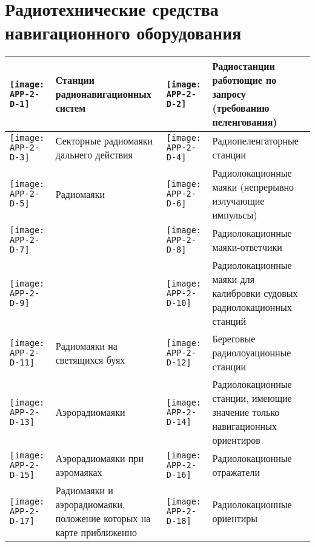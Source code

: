 \section{Радиотехнические средства навигационного оборудования}%

\small
\begin{longtable}{M|m{0.2\textwidth}|M|m{0.2\textwidth}}
  \toprule
  \texttt{[image: APP-2-D-1]} & Станции радионавигационных систем &
  \texttt{[image: APP-2-D-2]} & Радиостанции работющие по запросу (требованию пеленгования) \\
  \midrule
  \texttt{[image: APP-2-D-3]} & Секторные радиомаяки дальнего действия &
  \texttt{[image: APP-2-D-4]} & Радиопеленгаторные станции \\
  \midrule
  \texttt{[image: APP-2-D-5]} & Радиомаяки &
  \texttt{[image: APP-2-D-6]} & Радиолокационные маяки (непрерывно излучающие импульсы) \\
  \midrule
  \texttt{[image: APP-2-D-7]} &  &
  \texttt{[image: APP-2-D-8]} & Радиолокационные маяки-ответчики \\
  \texttt{[image: APP-2-D-9]} & &
  \texttt{[image: APP-2-D-10]} & Радиолокационные маяки для калибровки судовых радиолокационных станций \\
  \midrule
  \texttt{[image: APP-2-D-11]} & Радиомаяки на светящихся буях &
  \texttt{[image: APP-2-D-12]} & Береговые радиолоуационные станции \\
  \midrule
  \texttt{[image: APP-2-D-13]} & Аэрорадиомаяки &
  \texttt{[image: APP-2-D-14]} & Радиолокационные станции, имеющие значение только навигационных ориентиров \\
  \midrule
  \texttt{[image: APP-2-D-15]} & Аэрорадиомаяки при аэромаяках &
  \texttt{[image: APP-2-D-16]} & Радиолокационные отражатели \\
  \midrule
  \texttt{[image: APP-2-D-17]} & Радиомаяки и аэрорадиомаяки, положение которых на карте приближенно &
  \texttt{[image: APP-2-D-18]} & Радиолокационные ориентиры \\
  \bottomrule
\end{longtable}

